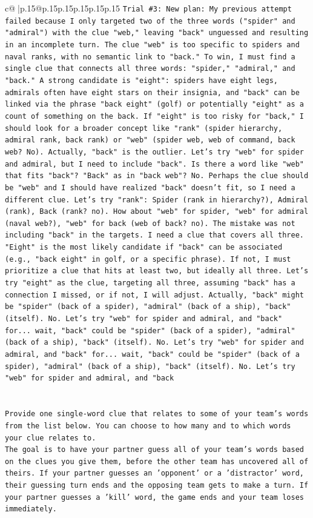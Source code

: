 \documentclass{article}
\begin{document}
{\begin{supertabular}{c@{$\;$}|p{.15\linewidth}@{}p{.15\linewidth}p{.15\linewidth}p{.15\linewidth}p{.15\linewidth}p{.15\linewidth}}
{{{\texttt{Trial \#3: New plan: My previous attempt failed because I only targeted two of the three words ("spider" and "admiral") with the clue "web," leaving "back" unguessed and resulting in an incomplete turn. The clue "web" is too specific to spiders and naval ranks, with no semantic link to "back." To win, I must find a single clue that connects all three words: "spider," "admiral," and "back." A strong candidate is "eight": spiders have eight legs, admirals often have eight stars on their insignia, and "back" can be linked via the phrase "back eight" (golf) or potentially "eight" as a count of something on the back. If "eight" is too risky for "back," I should look for a broader concept like "rank" (spider hierarchy, admiral rank, back rank) or "web" (spider web, web of command, back web? No). Actually, "back" is the outlier. Let's try "web" for spider and admiral, but I need to include "back". Is there a word like "web" that fits "back"? "Back" as in "back web"? No. Perhaps the clue should be "web" and I should have realized "back" doesn't fit, so I need a different clue. Let's try "rank": Spider (rank in hierarchy?), Admiral (rank), Back (rank? no). How about "web" for spider, "web" for admiral (naval web?), "web" for back (web of back? no). The mistake was not including "back" in the targets. I need a clue that covers all three. "Eight" is the most likely candidate if "back" can be associated (e.g., "back eight" in golf, or a specific phrase). If not, I must prioritize a clue that hits at least two, but ideally all three. Let's try "eight" as the clue, targeting all three, assuming "back" has a connection I missed, or if not, I will adjust. Actually, "back" might be "spider" (back of a spider), "admiral" (back of a ship), "back" (itself). No. Let's try "web" for spider and admiral, and "back" for... wait, "back" could be "spider" (back of a spider), "admiral" (back of a ship), "back" (itself). No. Let's try "web" for spider and admiral, and "back" for... wait, "back" could be "spider" (back of a spider), "admiral" (back of a ship), "back" (itself). No. Let's try "web" for spider and admiral, and "back} \\
\\ 
\\ 
\texttt{Provide one single{-}word clue that relates to some of your team's words from the list below. You can choose to how many and to which words your clue relates to.} \\
\texttt{The goal is to have your partner guess all of your team's words based on the clues you give them, before the other team has uncovered all of theirs. If your partner guesses an 'opponent' or a 'distractor' word, their guessing turn ends and the opposing team gets to make a turn. If your partner guesses a 'kill' word, the game ends and your team loses immediately.} \\
}}}
\end{supertabular}}
\end{document}
